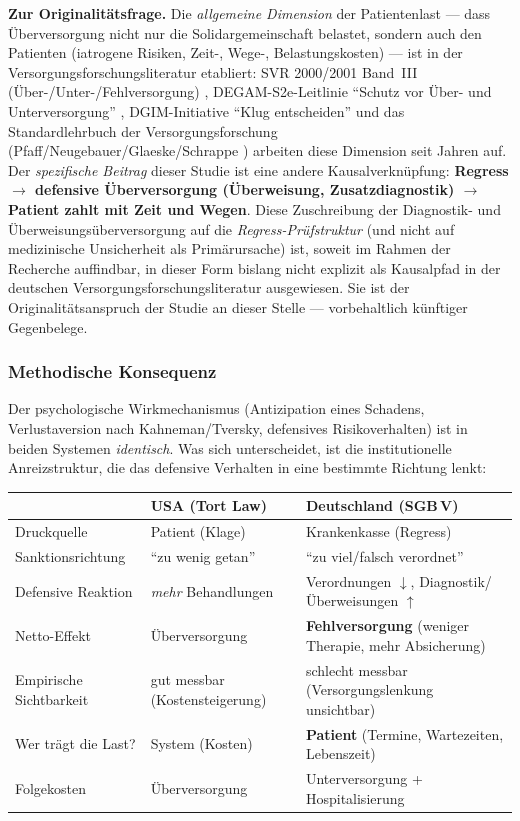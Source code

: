 \documentclass{umbruch-position}
\begin{document}
\medskip
\noindent \textbf{Zur Originalitätsfrage.} Die \emph{allgemeine Dimension} der Patientenlast --- dass Überversorgung nicht nur die Solidargemeinschaft belastet, sondern auch den Patienten (iatrogene Risiken, Zeit-, Wege-, Belastungs\-kosten) --- ist in der Versorgungs\-forschungs\-literatur etabliert: SVR 2000/2001 Band~III (Über-/Unter-/Fehlversorgung) \cite{svr2001_band3}, DEGAM-S2e-Leitlinie ``Schutz vor Über- und Unterversorgung'' \cite{degam_s2e_ueberversorgung}, DGIM-Initiative ``Klug entscheiden'' \cite{dgim_klug_entscheiden} und das Standard\-lehrbuch der Versorgungs\-forschung (Pfaff/Neugebauer/Glaeske/Schrappe \cite{glaeske_pfaff_lehrbuch}) arbeiten diese Dimension seit Jahren auf. Der \emph{spezifische Beitrag} dieser Studie ist eine andere Kausal\-verknüpfung: \textbf{Regress $\to$ defensive Überversorgung (Überweisung, Zusatz\-diagnostik) $\to$ Patient zahlt mit Zeit und Wegen}. Diese Zuschreibung der Diagnostik- und Überweisungs\-überversorgung auf die \textit{Regress-Prüfstruktur} (und nicht auf medizinische Unsicherheit als Primärursache) ist, soweit im Rahmen der Recherche auffindbar, in dieser Form bislang nicht explizit als Kausalpfad in der deutschen Versorgungs\-forschungs\-literatur ausgewiesen. Sie ist der Originalitäts\-anspruch der Studie an dieser Stelle --- vorbehaltlich künftiger Gegenbelege.

\subsubsection{Methodische Konsequenz}

Der psychologische Wirkmechanismus (Antizipation eines Schadens, Verlustaversion nach Kahneman/Tversky, defensives Risikoverhalten) ist in beiden Systemen \textit{identisch}. Was sich unterscheidet, ist die institutionelle Anreizstruktur, die das defensive Verhalten in eine bestimmte Richtung lenkt:

{\small
\begin{tabularx}{\textwidth}{X X X}
\toprule
 & \textbf{USA (Tort Law)} & \textbf{Deutschland (SGB\,V)} \\
\midrule
Druckquelle & Patient (Klage) & Krankenkasse (Regress) \\
Sanktionsrichtung & ``zu wenig getan'' & ``zu viel/falsch verordnet'' \\
Defensive Reaktion & \textit{mehr} Behandlungen & Verordnungen $\downarrow$, Diagnostik/Überweisungen $\uparrow$ \\
Netto-Effekt & Überversorgung & \textbf{Fehlversorgung} (weniger Therapie, mehr Absicherung) \\
Empirische Sichtbarkeit & gut messbar (Kostensteigerung) & schlecht messbar (Versorgungslenkung unsichtbar) \\
Wer trägt die Last? & System (Kosten) & \textbf{Patient} (Termine, Wartezeiten, Lebenszeit) \\
Folgekosten & Überversorgung & Unterversorgung + Hospitalisierung \\
\bottomrule
\end{tabularx}
}
\end{document}
